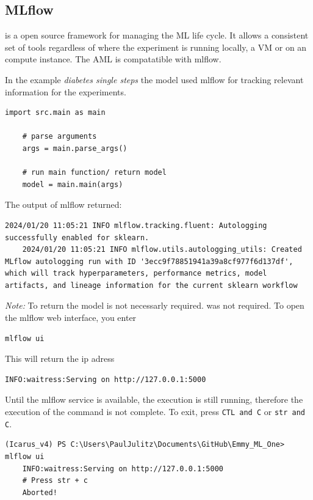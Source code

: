 \subsection{MLflow}

\mlflow is a open source framework for managing the \gls{ML} life cycle. It allows a consistent set of tools regardless of where the experiment is running locally, a \gls{VM} or on an \Azure compute instance. The \gls{AML} is compatatible with mlflow.

In the example \textit{diabetes single steps} the model used mlflow for tracking relevant information for the experiments.
\begin{lstlisting}[language=iPython]
	import src.main as main
	
	# parse arguments
	args = main.parse_args()
	
	# run main function/ return model
	model = main.main(args)
\end{lstlisting}
The output of mlflow returned:
\begin{lstlisting}[style=CMD]
	2024/01/20 11:05:21 INFO mlflow.tracking.fluent: Autologging successfully enabled for sklearn.
	2024/01/20 11:05:21 INFO mlflow.utils.autologging_utils: Created MLflow autologging run with ID '3ecc9f78851941a39a8cf977f6d137df', which will track hyperparameters, performance metrics, model artifacts, and lineage information for the current sklearn workflow
\end{lstlisting}
\textit{Note:} To return the model is not necessarly required. was not required.
To open the mlflow web interface, you enter 
\begin{lstlisting}[style=CMD]
	mlflow ui
\end{lstlisting}
This will return the ip adress
\begin{lstlisting}[style=CMD]
	INFO:waitress:Serving on http://127.0.0.1:5000	
\end{lstlisting}
Until the mlflow service is available, the execution is still running, therefore the execution of the command is not complete. To exit, press \verb+CTL and C+ or \verb+str and C+.
\begin{lstlisting}[style=CMD]
	(Icarus_v4) PS C:\Users\PaulJulitz\Documents\GitHub\Emmy_ML_One> mlflow ui                    
	INFO:waitress:Serving on http://127.0.0.1:5000
	# Press str + c
	Aborted!
\end{lstlisting}



